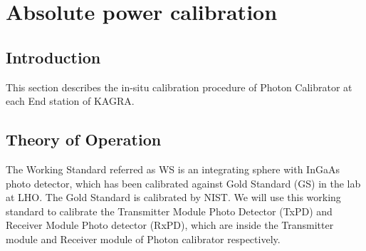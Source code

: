 
\chapter{Absolute power calibration} %
\label{Chapter5} %
\section{Introduction}
\label{sec:intro}
This section describes the in-situ calibration procedure of Photon Calibrator at each End station of KAGRA.

\section{Theory of Operation}

The Working Standard referred as WS  is an integrating sphere with InGaAs photo detector, which has been calibrated against Gold Standard (GS) in the lab at LHO. The Gold Standard is calibrated by NIST. We will use this working standard to calibrate the Transmitter Module Photo Detector (TxPD) and Receiver Module Photo detector (RxPD), which are inside the Transmitter module and Receiver module of Photon calibrator respectively.

